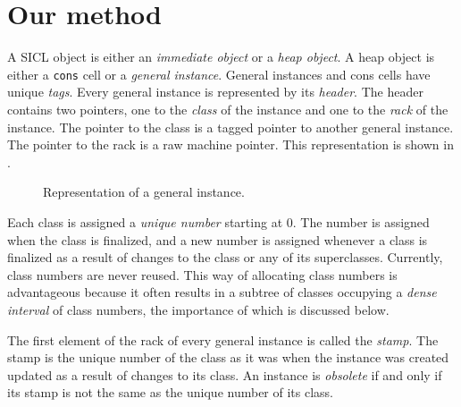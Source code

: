 \section{Our method}

A SICL object is either an \emph{immediate object} or a \emph{heap
  object}.  A heap object is either a \texttt{cons} cell or a
\emph{general instance}.  General instances and cons cells have unique
\emph{tags}.  Every general instance is represented by its
\emph{header}.  The header contains two pointers, one to the
\emph{class} of the instance and one to the \emph{rack} of the
instance.  The pointer to the class is a tagged pointer to another
general instance.  The pointer to the rack is a raw machine pointer.  
This representation is shown in .

\begin{figure}
\begin{center}
\end{center}
\caption{\label{fig-general-instance}
Representation of a general instance.}
\end{figure}

Each class is assigned a \emph{unique number} starting at $0$.  The
number is assigned when the class is finalized, and a new number is
assigned whenever a class is finalized as a result of changes to the
class or any of its superclasses.  Currently, class numbers are never
reused.  This way of allocating class numbers is advantageous because
it often results in a subtree of classes occupying a \emph{dense
  interval} of class numbers, the importance of which is discussed
below. 

The first element of the rack of every general instance is called the
\emph{stamp}.  The stamp is the unique number of the class as it was
when the instance was created updated as a result of changes to its
class.  An instance is \emph{obsolete} if and only if its stamp is not
the same as the unique number of its class.
